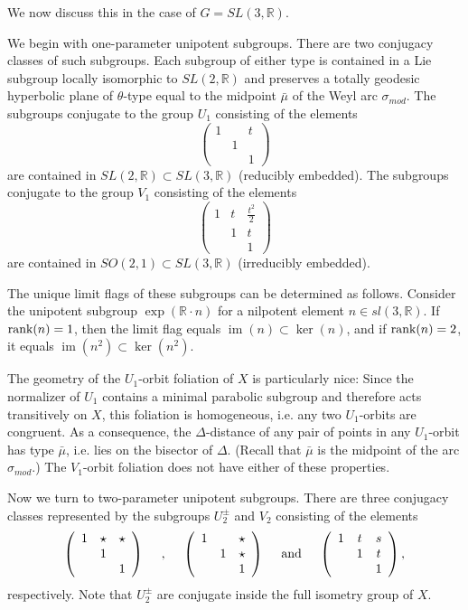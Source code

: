 \documentclass[12pt]{article}
\theoremstyle{boldplain}
\theoremstyle{bolddefinition}
\numberwithin{equation}{section}
\def\R{{\mathbb R}}
\def\De{\Delta}
\def\si{\sigma}
\def\im{\operatorname{im}}
\def\rank{\mathop{\hbox{rank}}}
\def\simod{\si_{mod}}
\begin{document}
We now discuss this in the case of $G=SL(3,\R)$.

We begin with one-parameter unipotent subgroups.
There are two conjugacy classes of such subgroups.
Each subgroup of either type is contained in a Lie subgroup locally isomorphic to $SL(2,\R)$
and preserves a totally geodesic hyperbolic plane of $\theta$-type equal to the midpoint $\bar\mu$ of the Weyl arc $\simod$.
The subgroups conjugate to the group $U_1$ consisting of the elements
$$
\left ( \begin{array}{ccc}
1&&t\\
&1&\\
&&1\end{array}
\right) 
$$
are contained in $SL(2,\R)\subset SL(3,\R)$ (reducibly embedded).
The subgroups conjugate to the group $V_1$ consisting of the elements
$$
\left ( \begin{array}{ccc}
1&t&\frac{t^2}{2}\\
&1&t\\
&&1\end{array}
\right) 
$$
are contained in $SO(2,1)\subset SL(3,\R)$ (irreducibly embedded).

The unique limit flags of these subgroups can be determined as follows.
Consider the unipotent subgroup $\exp(\R\cdot n)$ for a nilpotent element $n\in sl(3,\R)$.
If $\rank(n)=1$, then the limit flag equals $\im(n)\subset\ker(n)$,
and if $\rank(n)=2$, it equals $\im(n^2)\subset\ker(n^2)$.

The geometry of the $U_1$-orbit foliation of $X$ is particularly nice:
Since the normalizer of $U_1$ contains a minimal parabolic subgroup
and therefore acts transitively on $X$,
this foliation is homogeneous, i.e. any two $U_1$-orbits are congruent.
As a consequence, the $\De$-distance of any pair of points in any $U_1$-orbit has type $\bar\mu$,
i.e. lies on the bisector of $\De$. {(Recall that $\bar\mu$ is the midpoint of the arc $\simod$.) } 
The $V_1$-orbit foliation does not have either of these properties.

Now we turn to two-parameter unipotent subgroups.
There are three conjugacy classes 
represented by the subgroups $U_2^{\pm}$ and $V_2$ consisting of the elements
$$
\left( \begin{array}{ccc}
1&\star &\star \\
&1&\\
&&1\end{array}
\right) 
\quad \hbox{ , }  \quad 
\left( \begin{array}{ccc}
1&&\star \\
&1&\star \\
&&1\end{array}
\right)
\quad \hbox{ and }  \quad 
\left( \begin{array}{ccc}
1&t&s \\
&1&t \\
&&1\end{array}
\right),
$$
respectively.
Note that $U_2^{\pm}$ are conjugate inside the full isometry group of $X$. 
\end{document}
